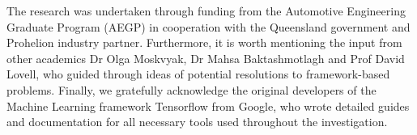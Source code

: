 The research was undertaken through funding from the Automotive Engineering Graduate Program (AEGP) in cooperation with the Queensland government and Prohelion industry partner.
Furthermore, it is worth mentioning the input from other academics Dr Olga Moskvyak, Dr Mahsa Baktashmotlagh and Prof David Lovell, who guided through ideas of potential resolutions to framework-based problems.
Finally, we gratefully acknowledge the original developers of the Machine Learning framework Tensorflow from Google, who wrote detailed guides and documentation for all necessary tools used throughout the investigation.
